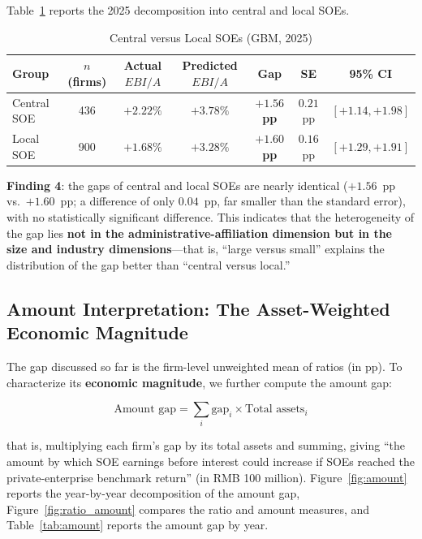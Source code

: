 \documentclass[11pt,a4paper]{article}
\begin{document}
Table~\ref{tab:central} reports the 2025 decomposition into central and local SOEs.

\begin{table}[htbp]
\centering
\caption{Central versus Local SOEs (GBM, 2025)}
\label{tab:central}
\begin{threeparttable}
\small
\begin{tabular}{lcccccc}
\toprule
Group & $n$ (firms) & Actual $EBI/A$ & Predicted $EBI/A$ & Gap & SE & 95\% CI \\
\midrule
Central SOE & 436 & $+2.22\%$ & $+3.78\%$ & \textbf{$+1.56$pp} & $0.21$pp & $[+1.14,+1.98]$ \\
Local SOE & 900 & $+1.68\%$ & $+3.28\%$ & \textbf{$+1.60$pp} & $0.16$pp & $[+1.29,+1.91]$ \\
\bottomrule
\end{tabular}
\end{threeparttable}
\end{table}

\medskip
\noindent\textbf{Finding 4}: the gaps of central and local SOEs are nearly identical ($+1.56$~pp vs.\ $+1.60$~pp; a difference of only $0.04$~pp, far smaller than the standard error), with no statistically significant difference. This indicates that the heterogeneity of the gap lies \textbf{not in the administrative-affiliation dimension but in the size and industry dimensions}---that is, ``large versus small'' explains the distribution of the gap better than ``central versus local.''

\subsection{Amount Interpretation: The Asset-Weighted Economic Magnitude}

The gap discussed so far is the firm-level unweighted mean of ratios (in pp). To characterize its \textbf{economic magnitude}, we further compute the amount gap:

\begin{equation}
\text{Amount gap} = \sum_i \text{gap}_i \times \text{Total assets}_i
\end{equation}

that is, multiplying each firm's gap by its total assets and summing, giving ``the amount by which SOE earnings before interest could increase if SOEs reached the private-enterprise benchmark return'' (in RMB 100 million). Figure~\ref{fig:amount} reports the year-by-year decomposition of the amount gap, Figure~\ref{fig:ratio_amount} compares the ratio and amount measures, and Table~\ref{tab:amount} reports the amount gap by year.
\end{document}
